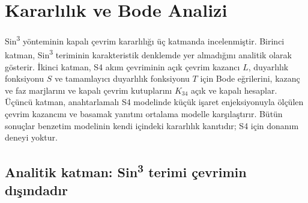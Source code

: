 \section{Kararlılık ve Bode Analizi}
\label{sec:kararlilik-bode}

Sin\textsuperscript{3} yönteminin kapalı çevrim kararlılığı üç katmanda incelenmiştir. Birinci katman, Sin\textsuperscript{3} teriminin karakteristik denklemde yer almadığını analitik olarak gösterir. İkinci katman, S4 akım çevriminin açık çevrim kazancı $L$, duyarlılık fonksiyonu $S$ ve tamamlayıcı duyarlılık fonksiyonu $T$ için Bode eğrilerini, kazanç ve faz marjlarını ve kapalı çevrim kutuplarını $K_{34}$ açık ve kapalı hesaplar. Üçüncü katman, anahtarlamalı S4 modelinde küçük işaret enjeksiyonuyla ölçülen çevrim kazancını ve basamak yanıtını ortalama modelle karşılaştırır. Bütün sonuçlar benzetim modelinin kendi içindeki kararlılık kanıtıdır; S4 için donanım deneyi yoktur.

\subsection{Analitik katman: Sin\texorpdfstring{\textsuperscript{3}}{3} terimi çevrimin dışındadır}

